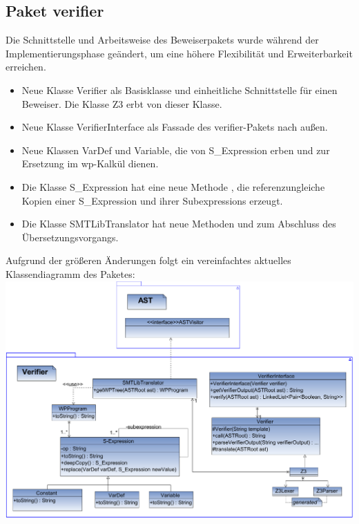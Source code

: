\subsection{Paket verifier}
Die Schnittstelle und Arbeitsweise des Beweiserpakets wurde w\"{a}hrend der Implementierungsphase ge\"{a}ndert, um eine h\"{o}here Flexibilit\"{a}t und Erweiterbarkeit erreichen.
\begin{itemize}
  \item Neue Klasse Verifier als Basisklasse und einheitliche Schnittstelle f\"{u}r einen Beweiser. Die Klasse Z3 erbt von dieser Klasse.
  \item Neue Klasse VerifierInterface als Fassade des verifier-Pakets nach au\ss en.
  \item Neue Klassen VarDef und Variable, die von S\_Expression erben und zur Ersetzung im wp-Kalk\"{u}l dienen.
  \item Die Klasse S\_Expression hat eine neue Methode , die referenzungleiche Kopien einer S\_Expression und ihrer Subexpressions erzeugt.
  \item Die Klasse SMTLibTranslator hat neue Methoden  und  zum Abschluss des \"{U}bersetzungsvorgangs.
\end{itemize}
Aufgrund der gr\"{o}\ss eren \"{A}nderungen folgt ein vereinfachtes aktuelles Klassendiagramm des Paketes:\\
\includegraphics[width=0.8\paperwidth]{images/Verifier.pdf}

